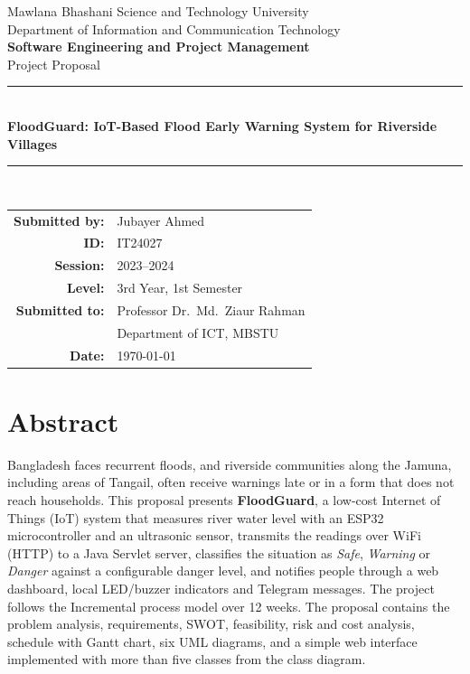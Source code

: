 \documentclass[12pt,a4paper]{article}
\begin{document}
\begin{titlepage}
\centering
{\large Mawlana Bhashani Science and Technology University\\
Department of Information and Communication Technology\\[1.5cm]}
{\Large\bfseries Software Engineering and Project Management\\[0.3cm]}
{\large Project Proposal\\[1.5cm]}
\rule{\textwidth}{1.5pt}\\[0.4cm]
{\LARGE\bfseries FloodGuard: IoT-Based Flood Early Warning System for Riverside Villages\\[0.4cm]}
\rule{\textwidth}{1.5pt}\\[1.5cm]
\begin{tabular}{rl}
\textbf{Submitted by:} & Jubayer Ahmed\\
\textbf{ID:} & IT24027\\
\textbf{Session:} & 2023--2024\\
\textbf{Level:} & 3rd Year, 1st Semester\\[0.6cm]
\textbf{Submitted to:} & Professor Dr.\ Md.\ Ziaur Rahman\\
 & Department of ICT, MBSTU\\[0.6cm]
\textbf{Date:} & \today
\end{tabular}
\end{titlepage}

\tableofcontents
\newpage

\section*{Abstract}
Bangladesh faces recurrent floods, and riverside communities along the Jamuna, including areas of Tangail, often receive warnings late or in a form that does not reach households. This proposal presents \textbf{FloodGuard}, a low-cost Internet of Things (IoT) system that measures river water level with an ESP32 microcontroller and an ultrasonic sensor, transmits the readings over WiFi (HTTP) to a Java Servlet server, classifies the situation as \emph{Safe}, \emph{Warning} or \emph{Danger} against a configurable danger level, and notifies people through a web dashboard, local LED/buzzer indicators and Telegram messages. The project follows the Incremental process model over 12 weeks. The proposal contains the problem analysis, requirements, SWOT, feasibility, risk and cost analysis, schedule with Gantt chart, six UML diagrams, and a simple web interface implemented with more than five classes from the class diagram.
\end{document}
